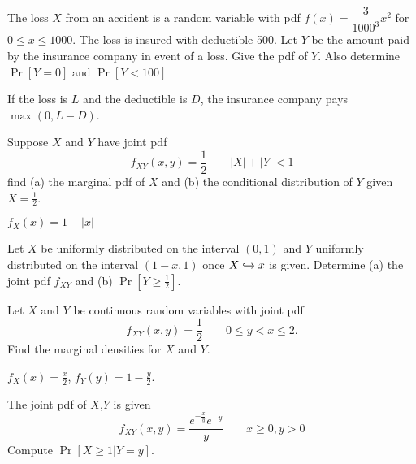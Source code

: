 \documentclass[../main.tex]{subfiles}
\begin{document}
\begin{example}
	The loss $X$ from an accident is a random variable with pdf $f(x) = \dfrac{3}{1000^3}x^2$ for $0 \leq x \leq 1000$. The loss is insured with
	deductible 500. Let $Y$ be the amount paid by the insurance company in event
	of a loss. Give the pdf of $Y$. Also determine $\Pr[Y=0]$ and $\Pr[Y<100]$
\end{example}
\begin{remark}
    If the loss is $L$ and the deductible is $D$, the insurance company pays $\max(0, L-D)$. 
\end{remark}
\begin{solution}
\end{solution}
\begin{example}
	Suppose $X$ and $Y$ have joint pdf
	$$f_{XY}(x,y) = \dfrac{1}{2} \qquad |X| + |Y| < 1$$
	find (a) the marginal pdf of $X$ and (b) the conditional distribution of $Y$
	given $X = \frac12$.
\end{example}
\begin{solution}
$f_X(x) = 1 - |x|$
\end{solution}
\begin{example}
	Let $X$ be uniformly distributed on the interval $(0,1)$ and $Y$
	uniformly distributed on the interval $(1-x,1)$ once $X \hookrightarrow x$ is given.
	Determine (a) the joint pdf $f_{XY}$ and (b) $\Pr[Y \geq \frac12]$.
\end{example}
\begin{solution}
\end{solution}
\begin{example}
	Let $X$ and $Y$ be continuous random variables with joint pdf
	$$f_{XY}(x,y) = \dfrac{1}{2} \qquad 0\leq y <x \leq 2.$$
	Find the marginal densities for $X$ and $Y$.
\end{example}
$f_X(x) = \frac x 2$, $f_Y(y) = 1 - \frac y 2$. 
\begin{example}
	The joint pdf of $X$,$Y$ is given
	$$f_{XY}(x,y) = \dfrac{e^{-\frac{x}{y}}e^{-y}}{y}\qquad x\geq 0, y>0$$
	Compute $\Pr[X \geq 1 | Y=y]$.
\end{example}
\end{document}

